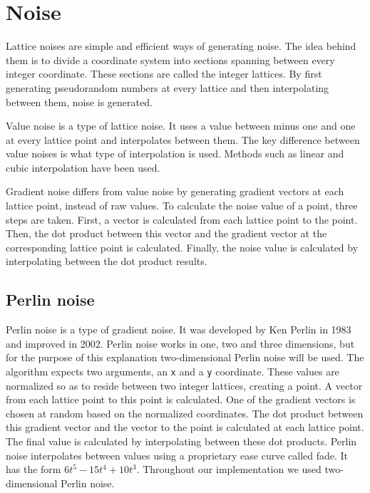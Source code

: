 \section{Noise}
Lattice noises are simple and efficient ways of generating noise\cite{TexturingModeling}. The idea behind them is to divide a coordinate system into sections spanning between every integer coordinate. These sections are called the integer lattices. By first generating pseudorandom numbers at every lattice and then interpolating between them, noise is generated.
		
\par
Value noise is a type of lattice noise. It uses a value between minus one and one at every lattice point and interpolates between them. The key difference between value noises is what type of interpolation is used. Methods such as linear and cubic interpolation have been used\cite{TexturingModeling}.
		
\par
Gradient noise differs from value noise by generating gradient vectors at each lattice point, instead of raw values. To calculate the noise value of a point, three steps are taken. First, a vector is calculated from each lattice point to the point.  Then, the dot product between this vector and the gradient vector at the corresponding lattice point is calculated. Finally, the noise value is calculated by interpolating between the dot product results.
		
\subsection{Perlin noise}
Perlin noise is a type of gradient noise. It was developed by Ken Perlin in 1983 and improved in 2002\cite{PerlinNoise}. Perlin noise works in one, two and three dimensions, but for the purpose of this explanation two-dimensional Perlin noise will be used. The algorithm expects two arguments, an \texttt{x} and a \texttt{y} coordinate. These values are normalized so as to reside between two integer lattices, creating a point. A vector from each lattice point to this point is calculated. One of the gradient vectors is chosen at random based on the normalized coordinates. The dot product between this gradient vector and the vector to the point is calculated at each lattice point. The final value is calculated by interpolating between these dot products. Perlin noise interpolates between values using a proprietary ease curve called fade. It has the form \begin{math}6t^5-15t^4+10t^3\end{math}. Throughout our implementation we used two-dimensional Perlin noise.
	
